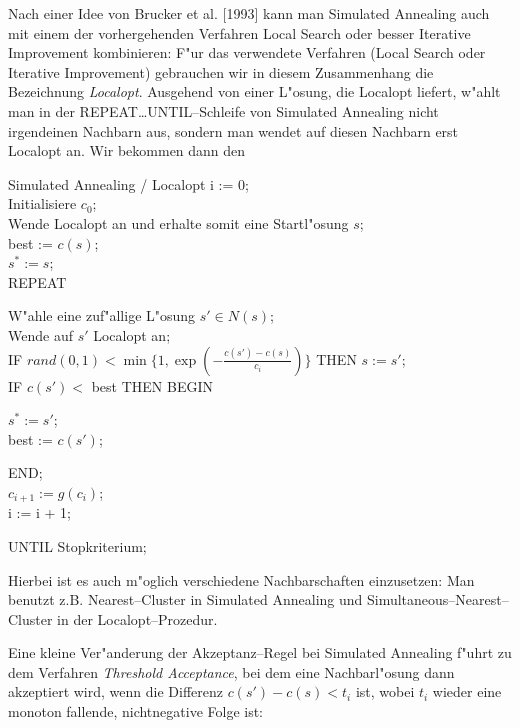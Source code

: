 Nach einer Idee von Brucker et al. [1993] kann man Simulated Annealing
auch mit einem der vorhergehenden Verfahren Local Search oder besser
Iterative Improvement kombinieren:
F"ur das verwendete Verfahren (Local Search oder Iterative Improvement)
gebrauchen wir in diesem Zusammenhang die Bezeichnung {\em Localopt}.
Ausgehend von einer L"osung, die Localopt
liefert, w"ahlt man in der REPEAT\dots UNTIL--Schleife von
Simulated Annealing nicht irgendeinen Nachbarn aus, sondern
man wendet auf diesen Nachbarn erst Localopt an. 
Wir bekommen dann den

\begin{algorithm}{Simulated Annealing / Localopt}
i := 0;\\
Initialisiere $c_0$;\\
Wende Localopt an und erhalte somit eine Startl"osung $s$;\\
best := $c(s)$;\\
$s^* := s$;\\
{REPEAT}
\begin{Block}
	W"ahle eine zuf"allige L"osung $s' \in N(s)$;\\
	Wende auf $s'$ Localopt an;\\
	{IF} $rand(0,1) < \min \{1,\exp({\scriptstyle - \frac{c(s') - c(s)}
	{c_i}})\}$ {THEN} $s := s'$;\\
	{IF} $c(s') < $ best {THEN BEGIN}
	\begin{Block}
		$s^* := s'$;\\
		best := $c(s')$;
	\end{Block}
	{END};\\
	$c_{i+1} := g(c_i)$;\\
	i := i + 1;
\end{Block}
{UNTIL} Stopkriterium;
\end{algorithm}

Hierbei ist es auch m"oglich verschiedene Nachbarschaften einzusetzen:
Man benutzt z.B. Nearest--Clu\-ster in Simu\-lated An\-nea\-ling und
Simul\-taneous--Nea\-rest--Clu\-ster in der Local\-opt--Prozedur.

Eine kleine Ver"anderung der Akzeptanz--Regel bei Simulated Annealing
f"uhrt zu dem Verfahren {\em Threshold Acceptance}, bei dem
eine Nachbarl"osung dann akzeptiert wird, wenn die Differenz
$c(s') - c(s) < t_i$ ist, wobei $t_i$ wieder eine monoton fallende, 
nichtnegative Folge ist:

